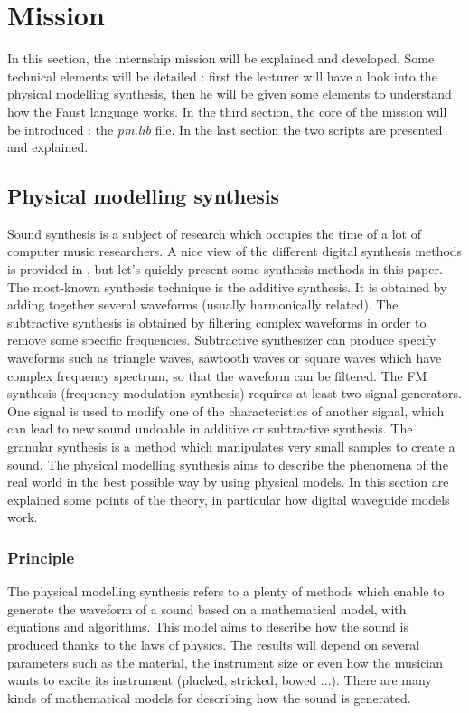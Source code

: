 \chapter{Mission}


In this section, the internship mission will be explained and developed. Some technical elements will be detailed : first the lecturer will have a look into the physical modelling synthesis, then he will be given some elements to understand how the Faust language works. In the third section, the core of the mission will be introduced : the \textit{pm.lib} file. In the last section the two scripts are presented and explained.

\section{Physical modelling synthesis}

Sound synthesis is a subject of research which occupies the time of a lot of computer music researchers. A nice view of the different digital synthesis methods is provided in \cite{soundsynthesis}, but let's quickly present some synthesis methods in this paper. The most-known synthesis technique is the additive synthesis. It is obtained by adding together several waveforms (usually harmonically related). The subtractive synthesis is obtained by filtering complex waveforms in order to remove some specific frequencies. Subtractive synthesizer can produce specify waveforms such as triangle waves, sawtooth waves or square waves which have complex frequency spectrum, so that the waveform can be filtered. The FM synthesis (frequency modulation synthesis) requires at least two signal generators. One signal is used to modify one of the characteristics of another signal, which can lead to new sound undoable in additive or subtractive synthesis. The granular synthesis is a method which manipulates very small samples to create a sound.
The physical modelling synthesis aims to describe the phenomena of the real world in the best possible way by using physical models. In this section are explained some points of the theory, in particular how digital waveguide models work.

\subsection{Principle}

The physical modelling synthesis refers to a plenty of methods which enable to generate the waveform of a sound based on a mathematical model, with equations and algorithms. This model aims to describe how the sound is produced thanks to the laws of physics. The results will depend on several parameters such as the material, the instrument size or even how the musician wants to excite its instrument (plucked, stricked, bowed ...).
There are many kinds of mathematical models for describing how the sound is generated.

